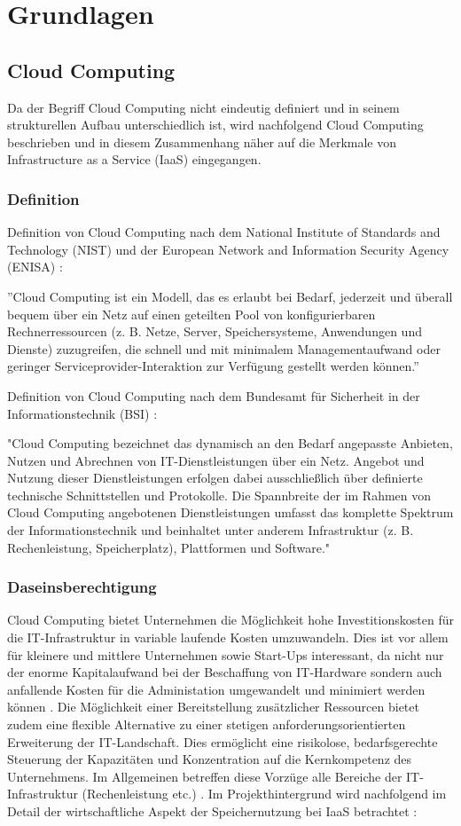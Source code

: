 \documentclass[13pt,a4paper,bibliography=totocnumbered,listof=totocnumbered]{scrartcl}
\begin{document}
\section{Grundlagen}\label{GrundlagenV}
\subsection{Cloud Computing}
Da der Begriff Cloud Computing nicht eindeutig definiert und in seinem strukturellen Aufbau unterschiedlich ist, wird nachfolgend Cloud Computing beschrieben und in diesem Zusammenhang näher auf die Merkmale von Infrastructure as a Service (IaaS) eingegangen.
\subsubsection{Definition}
Definition von Cloud Computing nach dem National Institute of Standards and Technology (NIST) und der European Network and Information Security Agency (ENISA) \cite{34}:

''Cloud Computing ist ein Modell, das es erlaubt bei Bedarf, jederzeit und überall bequem über ein Netz auf einen geteilten Pool von konfigurierbaren Rechnerressourcen (z. B. Netze, Server, Speichersysteme, Anwendungen und Dienste) zuzugreifen, die schnell und mit minimalem Managementaufwand oder geringer Serviceprovider-Interaktion zur Verfügung gestellt werden können.''

Definition von Cloud Computing nach dem Bundesamt für Sicherheit in der Informationstechnik (BSI) \cite{35}:

"Cloud Computing bezeichnet das dynamisch an den Bedarf angepasste Anbieten, Nutzen und Abrechnen von IT-Dienstleistungen über ein Netz. Angebot und Nutzung dieser Dienstleistungen erfolgen dabei ausschließlich über definierte technische Schnittstellen und Protokolle. Die Spannbreite der im Rahmen von Cloud Computing angebotenen Dienstleistungen umfasst das komplette Spektrum der Informationstechnik und beinhaltet unter anderem Infrastruktur (z. B. Rechenleistung, Speicherplatz), Plattformen und Software."

\subsubsection{Daseinsberechtigung}\label{CloudV}
Cloud Computing bietet Unternehmen die Möglichkeit hohe Investitionskosten für die IT-Infrastruktur in variable laufende Kosten umzuwandeln. Dies ist vor allem für kleinere und mittlere Unternehmen sowie Start-Ups interessant, da nicht nur der enorme Kapitalaufwand bei der Beschaffung von IT-Hardware sondern auch anfallende Kosten für die Administation umgewandelt und minimiert werden können \cite[S. 78]{45}. Die Möglichkeit einer Bereitstellung zusätzlicher Ressourcen bietet zudem eine flexible Alternative zu einer stetigen anforderungsorientierten Erweiterung der IT-Landschaft. Dies ermöglicht eine risikolose, bedarfsgerechte Steuerung der Kapazitäten und Konzentration auf die Kernkompetenz des Unternehmens. Im Allgemeinen betreffen diese Vorzüge alle Bereiche der IT-Infrastruktur (Rechenleistung etc.) \cite[S. 35]{39}. Im Projekthintergrund wird nachfolgend im Detail der wirtschaftliche Aspekt der Speichernutzung bei IaaS betrachtet \cite[S. 35 ff.]{39}:
\end{document}
